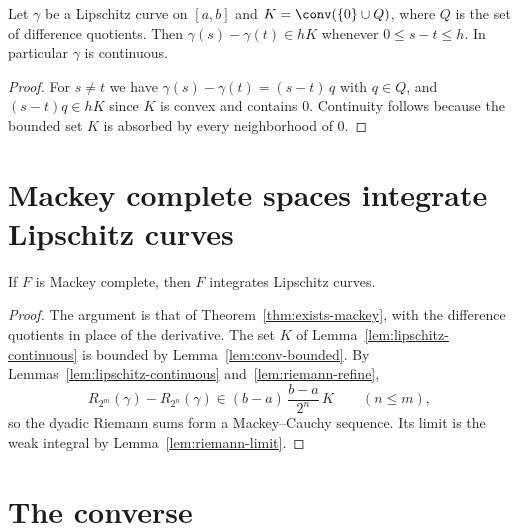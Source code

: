 \begin{lemma}
  \label{lem:lipschitz-continuous}
  \leanok
  Let $\gamma$ be a Lipschitz curve on $[a, b]$ and $K = \conv(\{0\} \cup Q)$, where $Q$ is the
  set of difference quotients. Then $\gamma(s) - \gamma(t) \in h K$ whenever
  $0 \leq s - t \leq h$. In particular $\gamma$ is continuous.
\end{lemma}

\begin{proof}
  \leanok
  For $s \neq t$ we have $\gamma(s) - \gamma(t) = (s - t)\, q$ with $q \in Q$, and
  $(s - t)q \in hK$ since $K$ is convex and contains $0$. Continuity follows because the
  bounded set $K$ is absorbed by every neighborhood of $0$.
\end{proof}

\section{Mackey complete spaces integrate Lipschitz curves}

\begin{theorem}
  \label{thm:mackey-to-lipschitz}
  \leanok
  If $F$ is Mackey complete, then $F$ integrates Lipschitz curves.
\end{theorem}

\begin{proof}
  \leanok
  The argument is that of Theorem~\ref{thm:exists-mackey}, with the difference quotients in
  place of the derivative. The set $K$ of Lemma~\ref{lem:lipschitz-continuous} is bounded by
  Lemma~\ref{lem:conv-bounded}. By Lemmas~\ref{lem:lipschitz-continuous}
  and~\ref{lem:riemann-refine},
  \[
    R_{2^m}(\gamma) - R_{2^n}(\gamma) \in (b - a)\,\frac{b - a}{2^n}\, K \qquad (n \leq m),
  \]
  so the dyadic Riemann sums form a Mackey--Cauchy sequence. Its limit is the weak integral by
  Lemma~\ref{lem:riemann-limit}.
\end{proof}

\section{The converse}

